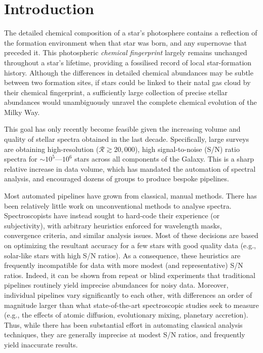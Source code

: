 \documentclass[12pt,preprint]{aastex}
\begin{document}
\section{Introduction}
The detailed chemical composition of a star's photosphere contains a reflection
of the formation environment when that star was born, and any supernovae that 
preceded it.  This photospheric \emph{chemical fingerprint} largely remains 
unchanged throughout a star's lifetime, providing a fossilised record of 
local star-formation history.  Although the differences in detailed chemical
abundances may be subtle between two formation sites, if stars could be linked
to their natal gas cloud by their chemical fingerprint, a sufficiently large
collection of precise stellar abundances would unambiguously unravel the
complete chemical evolution of the Milky Way. 


This goal has only recently become feasible given the increasing volume and 
quality of stellar spectra obtained in the last decade.  Specifically, large 
surveys are obtaining high-resolution ($\mathcal{R} \gtrsim 20,000$), high 
signal-to-noise (S/N) ratio spectra for $\sim10^5$---$10^6$ stars across all 
components of the Galaxy.  This is a sharp relative increase in data volume, 
which has mandated the automation of spectral analysis, and encouraged dozens of
groups to produce bespoke pipelines.


Most automated pipelines have grown from classical, manual methods.  There has 
been relatively little work on unconventional methods to analyse spectra.  
Spectroscopists have instead sought to hard-code their experience (or subjectivity), 
with arbitrary heuristics enforced for wavelength masks, convergence criteria, 
and similar analysis issues.  Most of these decisions are based on optimizing 
the resultant accuracy for a few stars with good quality data (e.g., solar-like
stars with high S/N ratios).  As a consequence, these heuristics are frequently 
incompatible for data with more modest (and representative) S/N ratios.  Indeed, 
it can be shown from repeat or blind experiments that traditional pipelines 
routinely yield imprecise abundances for noisy data.  Moreover, individual 
pipelines vary significantly to each other, with differences an order of 
magnitude larger than what state-of-the-art spectroscopic studies seek to 
measure (e.g., the effects of atomic diffusion, evolutionary mixing, planetary
accretion).  Thus, while there has been substantial effort in automating 
classical analysis techniques, they are generally imprecise at modest S/N 
ratios, and frequently yield inaccurate results.
\end{document}

